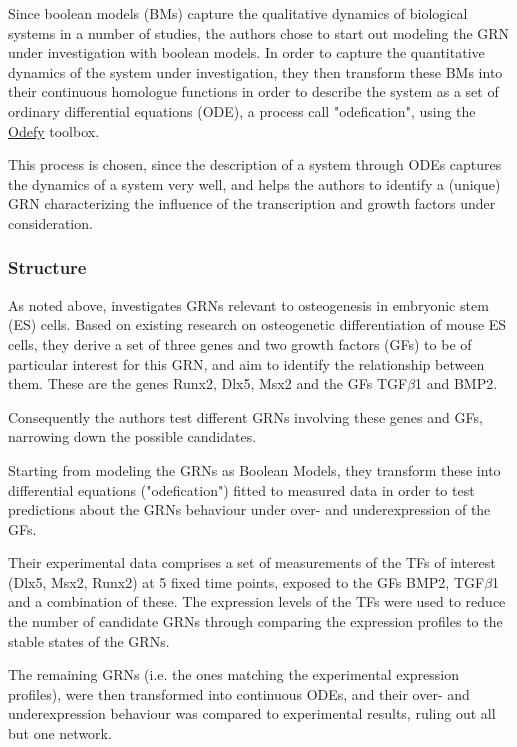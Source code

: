 \documentclass[11pt]{article}
\begin{document}
Since boolean models (BMs) capture the qualitative dynamics of biological systems in a number of studies, the authors chose to start out modeling the GRN under investigation with boolean models.
In order to capture the quantitative dynamics of the system under investigation, they then transform these BMs into their continuous homologue functions in order to describe the system as a set of ordinary differential equations (ODE), a process call "odefication", using the \href{http://www.helmholtz-muenchen.de/icb/software/odefy/index.html}{Odefy} toolbox.

This process is chosen, since the description of a system through ODEs captures the dynamics of a system very well, and helps the authors to identify a (unique) GRN characterizing the influence of the transcription and growth factors under consideration.

\subsubsection{Structure}
As noted above, \cite{Kirkham} investigates GRNs relevant to osteogenesis in embryonic stem (ES) cells. Based on existing research on osteogenetic differentiation of mouse ES cells, they derive a set of three genes and two growth factors (GFs) to be of particular interest for this GRN, and aim to identify the relationship between them. 
These are the genes Runx2, Dlx5, Msx2 and the GFs TGF$\beta$1 and BMP2.

Consequently the authors test different GRNs involving these genes and GFs, narrowing down the possible candidates. 

Starting from modeling the GRNs as Boolean Models, they transform these into differential equations ("odefication") fitted to measured data in order to test predictions about the GRNs behaviour under over- and underexpression of the GFs. 

Their experimental data comprises a set of measurements of the TFs of interest (Dlx5, Msx2, Runx2) at 5 fixed time points, exposed to the GFs BMP2, TGF$\beta$1 and a combination of these.
The expression levels of the TFs were used to reduce the number of candidate GRNs through comparing the expression profiles to the stable states of the GRNs.

The remaining GRNs (i.e. the ones matching the experimental expression profiles), were then transformed into continuous ODEs, and their over- and underexpression behaviour was compared to experimental results, ruling out all but one network.
\end{document}
